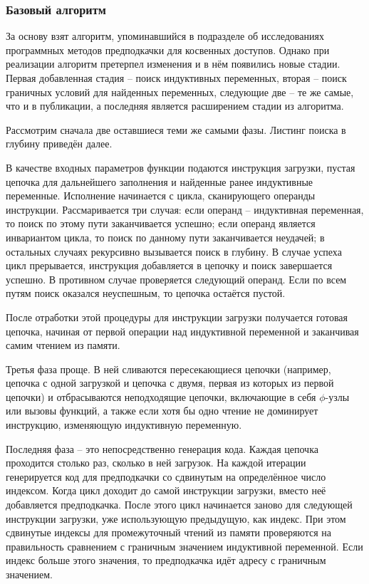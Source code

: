 \documentclass[12pt,a4paper]{article}
\begin{document}
\subsubsection{Базовый алгоритм}

\indent

За основу взят алгоритм, упоминавшийся в подразделе об исследованиях программных методов предподкачки для косвенных доступов\cite{AinsworthAI}. Однако при реализации алгоритм претерпел изменения и в нём появились новые стадии. Первая добавленная стадия -- поиск индуктивных переменных, вторая -- поиск граничных условий для найденных переменных, следующие две -- те же самые, что и в публикации, а последняя является расширением стадии из алгоритма.

Рассмотрим сначала две оставшиеся теми же самыми фазы. Листинг поиска в глубину приведён далее.



В качестве входных параметров функции подаются инструкция загрузки, пустая цепочка для дальнейшего заполнения и найденные ранее индуктивные переменные. Исполнение начинается с цикла, сканирующего операнды инструкции. Рассмаривается три случая: если операнд -- индуктивная переменная, то поиск по этому пути заканчивается успешно; если операнд является инвариантом цикла, то поиск по данному пути заканчивается неудачей; в остальных случаях рекурсивно вызывается поиск в глубину. В случае успеха цикл прерывается, инструкция добавляется в цепочку и поиск завершается успешно. В противном случае проверяется следующий операнд. Если по всем путям поиск оказался неуспешным, то цепочка остаётся пустой.

После отработки этой процедуры для инструкции загрузки получается готовая цепочка, начиная от первой операции над индуктивной переменной и заканчивая самим чтением из памяти.

Третья фаза проще. В ней сливаются пересекающиеся цепочки (например, цепочка с одной загрузкой и цепочка с двумя, первая из которых из первой цепочки) и отбрасываются неподходящие цепочки, включающие в себя $\phi$-узлы или вызовы функций, а также если хотя бы одно чтение не доминирует инструкцию, изменяющую индуктивную переменную.

Последняя фаза -- это непосредственно генерация кода. Каждая цепочка проходится столько раз, сколько в ней загрузок. На каждой итерации генерируется код для предподкачки со сдвинутым на определённое число индексом. Когда цикл доходит до самой инструкции загрузки, вместо неё добавляется предподкачка. После этого цикл начинается заново для следующей инструкции загрузки, уже использующую предыдущую, как индекс. При этом сдвинутые индексы для промежуточный чтений из памяти проверяются на правильность сравнением с граничным значением индуктивной переменной. Если индекс больше этого значения, то предподкачка идёт адресу с граничным значением.
\end{document}
